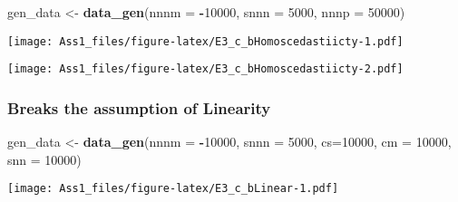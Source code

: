 \documentclass[
]{article}
\newenvironment{Shaded}{\begin{snugshade}}{\end{snugshade}}
\newcommand{\AttributeTok}[1]{\textcolor[rgb]{0.13,0.29,0.53}{#1}}
\newcommand{\DecValTok}[1]{\textcolor[rgb]{0.00,0.00,0.81}{#1}}
\newcommand{\FunctionTok}[1]{\textcolor[rgb]{0.13,0.29,0.53}{\textbf{#1}}}
\newcommand{\NormalTok}[1]{#1}
\newcommand{\OtherTok}[1]{\textcolor[rgb]{0.56,0.35,0.01}{#1}}
\newcommand{\SpecialCharTok}[1]{\textcolor[rgb]{0.81,0.36,0.00}{\textbf{#1}}}
\begin{document}
\begin{Shaded}
\begin{Highlighting}[]
\NormalTok{gen\_data }\OtherTok{\textless{}{-}} \FunctionTok{data\_gen}\NormalTok{(}\AttributeTok{nnnm =} \SpecialCharTok{{-}}\DecValTok{10000}\NormalTok{, }\AttributeTok{snnn =} \DecValTok{5000}\NormalTok{, }\AttributeTok{nnnp =} \DecValTok{50000}\NormalTok{)}
\end{Highlighting}
\end{Shaded}

\texttt{[image: Ass1\_files/figure-latex/E3\_c\_bHomoscedastiicty-1.pdf]}

\begin{Shaded}
\end{Shaded}

\texttt{[image: Ass1\_files/figure-latex/E3\_c\_bHomoscedastiicty-2.pdf]}

\subsubsection{Breaks the assumption of
Linearity}\label{breaks-the-assumption-of-linearity}

\begin{Shaded}
\begin{Highlighting}[]
\NormalTok{gen\_data }\OtherTok{\textless{}{-}} \FunctionTok{data\_gen}\NormalTok{(}\AttributeTok{nnnm =} \SpecialCharTok{{-}}\DecValTok{10000}\NormalTok{, }\AttributeTok{snnn =} \DecValTok{5000}\NormalTok{, }\AttributeTok{cs=}\DecValTok{10000}\NormalTok{, }\AttributeTok{cm =} \DecValTok{10000}\NormalTok{, }\AttributeTok{snn =} \DecValTok{10000}\NormalTok{)}
\end{Highlighting}
\end{Shaded}

\texttt{[image: Ass1\_files/figure-latex/E3\_c\_bLinear-1.pdf]}

\begin{Shaded}
\end{Shaded}
\end{document}

